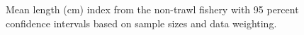 \documentclass[
]{scrartcl}
\begin{document}
\begin{figure}[H]


\caption{\label{fig-meanlt-nt}Mean length (cm) index from the non-trawl
fishery with 95 percent confidence intervals based on sample sizes and
data weighting.}

\end{figure}%
\end{document}
